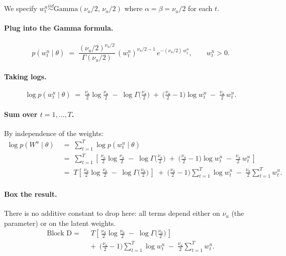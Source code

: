 \documentclass[11pt, a4paper, oneside]{article}
\begin{document}
We specify $w^u_t \overset{iid}{\sim} \mathrm{Gamma}(\nu_u/2,\, \nu_u/2)$
where $\alpha = \beta = \nu_u/2$ for each $t$.

\paragraph{Plug into the Gamma formula.}
\[
p(w^u_t \mid \theta)
\;=\; \frac{(\nu_u/2)^{\nu_u/2}}{\Gamma(\nu_u/2)}\,
(w^u_t)^{\nu_u/2 - 1}\, e^{-(\nu_u/2)\, w^u_t},
\qquad w^u_t > 0.
\]

\paragraph{Taking logs.}
\[
\log p(w^u_t \mid \theta)
\;=\; \tfrac{\nu_u}{2}\log\!\tfrac{\nu_u}{2}
\;-\; \log \Gamma\!\big(\tfrac{\nu_u}{2}\big)
\;+\; \big(\tfrac{\nu_u}{2} - 1\big)\log w^u_t
\;-\; \tfrac{\nu_u}{2}\, w^u_t.
\]

\paragraph{Sum over $t = 1, \ldots, T$.}
By independence of the weights:
\begin{align*}
\log p(W^u \mid \theta)
&\;=\; \sum_{t=1}^{T} \log p(w^u_t \mid \theta) \\[4pt]
&\;=\; \sum_{t=1}^{T} \left[\, \tfrac{\nu_u}{2}\log\!\tfrac{\nu_u}{2}
\;-\; \log \Gamma\!\big(\tfrac{\nu_u}{2}\big)
\;+\; \big(\tfrac{\nu_u}{2} - 1\big)\log w^u_t
\;-\; \tfrac{\nu_u}{2}\, w^u_t \,\right] \\[4pt]
&\;=\; T\!\left[\,\tfrac{\nu_u}{2}\log\!\tfrac{\nu_u}{2}
                  \;-\; \log \Gamma\!\big(\tfrac{\nu_u}{2}\big)\,\right]
\;+\; \big(\tfrac{\nu_u}{2} - 1\big)\sum_{t=1}^{T} \log w^u_t
\;-\; \tfrac{\nu_u}{2} \sum_{t=1}^{T} w^u_t.
\end{align*}

\paragraph{Box the result.}
There is no additive constant to drop here: all terms depend either on
$\nu_u$ (the parameter) or on the latent weights.
\begin{equation}
\boxed{\,
\begin{aligned}
\text{Block D} \;=\;
& \;\; T \left[\, \tfrac{\nu_u}{2}\log\!\tfrac{\nu_u}{2}
            \;-\; \log \Gamma\!\big(\tfrac{\nu_u}{2}\big)\,\right] \\[3pt]
& \;+\; \big(\tfrac{\nu_u}{2} - 1\big)\sum_{t=1}^{T}\log w^u_t
\;-\; \tfrac{\nu_u}{2}\sum_{t=1}^{T} w^u_t.
\end{aligned}
\,}
\label{eq:block-D}
\end{equation}
\end{document}

